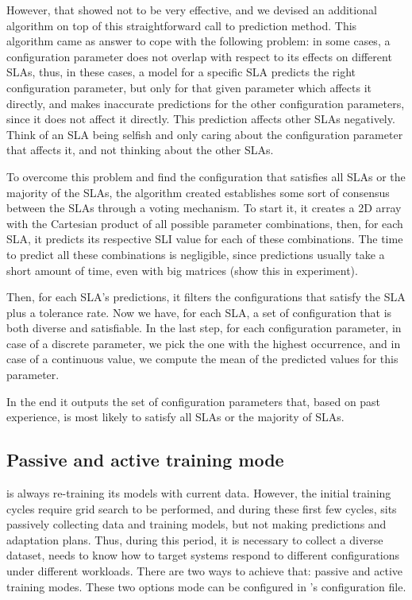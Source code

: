 However, that showed not to be very effective, and we devised an additional algorithm on top of this straightforward call to prediction method. This algorithm came as answer to cope with the following problem: in some cases, a configuration parameter does not overlap with respect to its effects on different SLAs, thus, in these cases, a model for a specific SLA predicts the right configuration parameter, but only for that given parameter which affects it directly, and makes inaccurate predictions for the other configuration parameters, since it does not affect it directly. This prediction affects other SLAs negatively. Think of an SLA being selfish and only caring about the configuration parameter that affects it, and not thinking about the other SLAs.

To overcome this problem and find the configuration that satisfies all SLAs or the majority of the SLAs, the algorithm created establishes some sort of consensus between the SLAs through a voting mechanism. To start it, it creates a 2D array with the Cartesian product of all possible parameter combinations, then, for each SLA, it predicts its respective SLI value for each of these combinations. The time to predict all these combinations is negligible, since predictions usually take a short amount of time, even with big matrices (show this in experiment).

Then, for each SLA's predictions, it filters the configurations that satisfy the SLA plus a tolerance rate. Now we have, for each SLA, a set of configuration that is both diverse and satisfiable. In the last step, for each configuration parameter, in case of a discrete parameter, we pick the one with the highest occurrence, and in case of a continuous value, we compute the mean of the predicted values for this parameter.

In the end it outputs the set of configuration parameters that, based on past experience, is most likely to satisfy all SLAs or the majority of SLAs.

\subsection{Passive and active training mode}

\projectname{} is always re-training its models with current data. However, the initial training cycles require grid search to be performed, and during these first few cycles, \projectname{} sits passively collecting data and training models, but not making predictions and adaptation plans. Thus, during this period, it is necessary to collect a diverse dataset, \projectname{} needs to know how to target systems respond to different configurations under different workloads. There are two ways to achieve that: passive and active training modes. These two options mode can be configured in \projectname{}'s configuration file.

